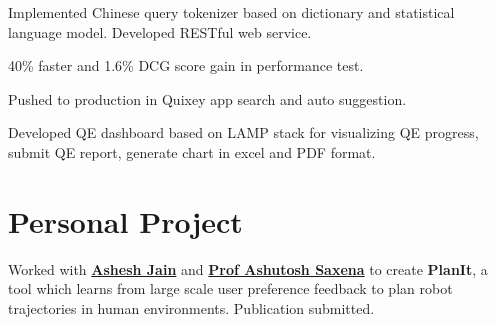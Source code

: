 \documentclass[letterpaper]{deedy-resume} %
\begin{document}
\begin{minipage}[t]{0.66\textwidth}
\sectionspace %



\sectionspace

\begin{tightitemize}
\item Implemented Chinese query tokenizer based on dictionary and statistical language model. Developed RESTful web service.
\item 40\% faster and 1.6\% DCG score gain in performance test.
\item Pushed to production in Quixey app search and auto suggestion.
\end{tightitemize}

\sectionspace %



\sectionspace

\begin{tightitemize}
\item Developed QE dashboard based on LAMP stack for visualizing QE progress, submit QE report, generate chart in excel and PDF format.
\end{tightitemize}

\sectionspace %


\section{Personal Project}


Worked with \textbf{\href{http://www.cs.cornell.edu/~ashesh/}{Ashesh Jain}} and \textbf{\href{http://www.cs.cornell.edu/~asaxena/}{Prof Ashutosh Saxena}} to create \textbf{PlanIt}, a tool which learns from large scale user preference feedback to plan robot trajectories in human environments. Publication submitted.

\sectionspace %


\end{minipage} %
\end{document}
